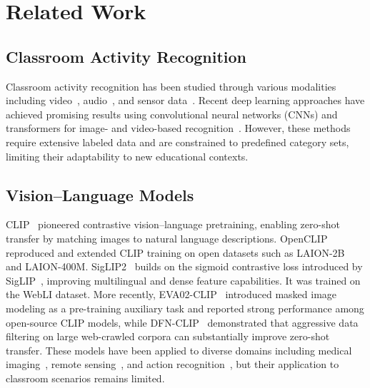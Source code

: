 \documentclass[electronics,article,submit,pdftex,moreauthors]{Definitions/mdpi}
\begin{document}
\section{Related Work}
\label{sec:related}

\subsection{Classroom Activity Recognition}

Classroom activity recognition has been studied through various modalities including video~\cite{whitehill2014automated}, audio~\cite{donnelly2017automatic}, and sensor data~\cite{dillenbourg2011classroom}.
Recent deep learning approaches have achieved promising results using convolutional neural networks (CNNs) and transformers for image- and video-based recognition~\cite{zhang2020classroom_cnn,li2022classroom_transformer}.
However, these methods require extensive labeled data and are constrained to predefined category sets, limiting their adaptability to new educational contexts.

\subsection{Vision--Language Models}

CLIP~\cite{radford2021learning} pioneered contrastive vision--language pretraining, enabling zero-shot transfer by matching images to natural language descriptions.
OpenCLIP~\cite{cherti2023reproducible} reproduced and extended CLIP training on open datasets such as LAION-2B~\cite{schuhmann2022laion5b} and LAION-400M.
SigLIP2~\cite{tschannen2025siglip2} builds on the sigmoid contrastive loss introduced by SigLIP~\cite{zhai2023sigmoid}, improving multilingual and dense feature capabilities. It was trained on the WebLI dataset.
More recently, EVA02-CLIP~\cite{sun2023eva02} introduced masked image modeling as a pre-training auxiliary task and reported strong performance among open-source CLIP models, while DFN-CLIP~\cite{fang2023data} demonstrated that aggressive data filtering on large web-crawled corpora can substantially improve zero-shot transfer.
These models have been applied to diverse domains including medical imaging~\cite{wang2022medclip}, remote sensing~\cite{liu2024remoteclip}, and action recognition~\cite{wang2021actionclip}, but their application to classroom scenarios remains limited.
\end{document}

